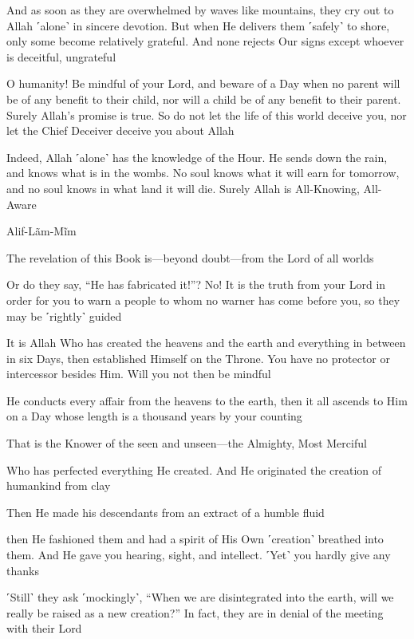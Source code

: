 And as soon as they are overwhelmed by waves like mountains, they cry out to Allah ˹alone˺ in sincere devotion. But when He delivers them ˹safely˺ to shore, only some become relatively grateful. And none rejects Our signs except whoever is deceitful, ungrateful

O humanity! Be mindful of your Lord, and beware of a Day when no parent will be of any benefit to their child, nor will a child be of any benefit to their parent. Surely Allah’s promise is true. So do not let the life of this world deceive you, nor let the Chief Deceiver deceive you about Allah

Indeed, Allah ˹alone˺ has the knowledge of the Hour. He sends down the rain, and knows what is in the wombs. No soul knows what it will earn for tomorrow, and no soul knows in what land it will die. Surely Allah is All-Knowing, All-Aware

Alif-Lãm-Mĩm

The revelation of this Book is—beyond doubt—from the Lord of all worlds

Or do they say, “He has fabricated it!”? No! It is the truth from your Lord in order for you to warn a people to whom no warner has come before you, so they may be ˹rightly˺ guided

It is Allah Who has created the heavens and the earth and everything in between in six Days, then established Himself on the Throne. You have no protector or intercessor besides Him. Will you not then be mindful

He conducts every affair from the heavens to the earth, then it all ascends to Him on a Day whose length is a thousand years by your counting

That is the Knower of the seen and unseen—the Almighty, Most Merciful

Who has perfected everything He created. And He originated the creation of humankind from clay

Then He made his descendants from an extract of a humble fluid

then He fashioned them and had a spirit of His Own ˹creation˺ breathed into them. And He gave you hearing, sight, and intellect. ˹Yet˺ you hardly give any thanks

˹Still˺ they ask ˹mockingly˺, “When we are disintegrated into the earth, will we really be raised as a new creation?” In fact, they are in denial of the meeting with their Lord

